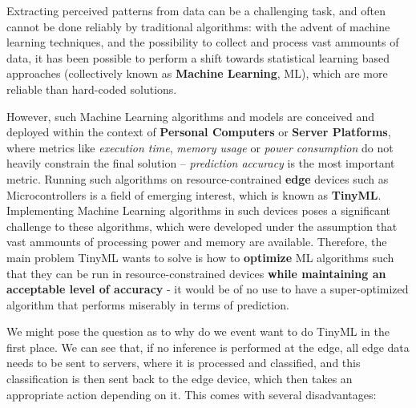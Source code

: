 Extracting perceived patterns from data can be a challenging task, and often cannot be done reliably by traditional algorithms: with the advent of machine learning techniques, and the possibility to collect and process vast ammounts of data, it 
has been possible to perform a shift towards statistical learning based approaches (collectively known as \textbf{Machine Learning}, ML), which are more reliable than hard-coded solutions.

However, such Machine Learning algorithms and models are conceived and deployed within the context of \textbf{Personal Computers} or \textbf{Server Platforms}, where metrics like \textit{execution time}, \textit{memory usage} or \textit{power consumption} do not heavily constrain the final solution -- \textit{prediction accuracy} is the most important metric.
Running such algorithms on resource-contrained \textbf{edge} devices such as Microcontrollers is a field of emerging interest, which is known as \textbf{TinyML}. 
Implementing Machine Learning algorithms in such devices poses a significant challenge to these algorithms, which were developed under the assumption that vast ammounts of processing power and memory are available. 
Therefore, the main problem TinyML wants to solve is how to \textbf{optimize} ML algorithms such that they can be run in resource-constrained devices \textbf{while maintaining an acceptable level of accuracy} - it would be of no use to have a super-optimized algorithm that performs miserably in terms of prediction.

We might pose the question as to why do we event want to do TinyML in the first place. 
We can see that, if no inference is performed at the edge, all edge data needs to be sent to servers, where it is processed and classified, and this classification is then sent back to the edge device, which then takes an appropriate action depending on it. This comes with several disadvantages:

